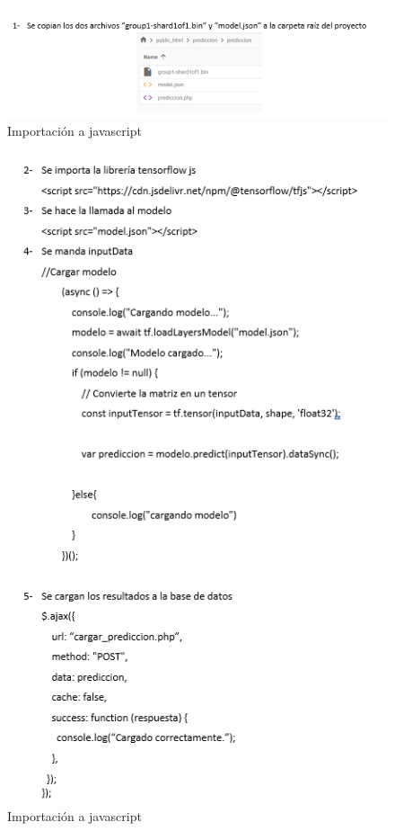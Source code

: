   \begin{figure}[H]
    \begin{center}
      \includegraphics[scale=0.90]{./sistema/segundaparte.png}
      \caption{Importación a javascript}
      \label{fig:python}
    \end{center}
  \end{figure}

  \begin{figure}[H]
    \begin{center}
      \includegraphics[scale=0.90]{./sistema/terceraparte.png}
      \caption{Importación a javascript}
      \label{fig:python}
    \end{center}
  \end{figure}


